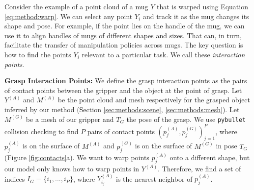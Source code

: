 \documentclass{article}
\newcommand{\pcx}[1]{\mathrm{X}^{(#1)}}
\begin{document}


Consider the example of a point cloud of a mug $Y$ that is warped using Equation \ref{eq:method:warp}. We can select any point $Y_i$ and track it as the mug changes its shape and pose. For example, if the point lies on the handle of the mug, we can use it to align handles of mugs of different shapes and sizes. That can, in turn, facilitate the transfer of manipulation policies across mugs. The key question is how to find the points $Y_i$ relevant to a particular task. We call these \emph{interaction points}.


\textbf{Grasp Interaction Points:} We define the grasp interaction points as the pairs of contact points between the gripper and the object at the point of grasp. Let $Y^{(A)}$ and $M^{(A)}$ be the point cloud and mesh respectively for the grasped object inferred by our method (Section \ref{sec:methods:scene}, \ref{sec:methods:mesh}). Let $M^{(G)}$ be a mesh of our gripper and $T_G$ the pose of the grasp. We use \texttt{pybullet} collision checking to find $P$ pairs of contact points $ (p_j^{(A)}, p_j^{(G)})_{j=1}^P$, where $p_j^{(A)}$ is on the surface of $M^{(A)}$ and $p_j^{(G)}$ is on the surface of $M^{(G)}$ in pose $T_G$ (Figure \ref{fig:contacts}a). We want to warp points $p_j^{(A)}$ onto a different shape, but our model only knows how to warp points in $Y^{(A)}$. Therefore, we find a set of indices $I_{G} = \{i_1,..., i_P\}$, where $Y^{(A)}_{i_j}$ is the nearest neighbor of $p^{(A)}_j$.
\end{document}
